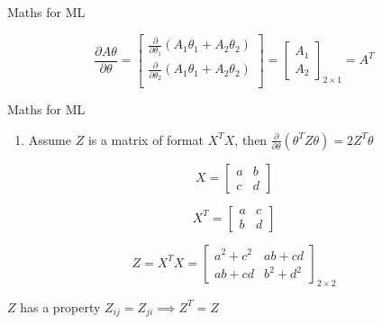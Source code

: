 \documentclass{beamer}
\newcounter{saveenumi}
\newcommand{\conti}{\setcounter{enumi}{\value{saveenumi}}}
\begin{document}
\begin{frame}{Maths for ML}

\begin{equation*}
    \frac{\partial A\theta}{\partial \theta} = \begin{bmatrix}
    \frac{\partial}{\partial \theta_{1} }(A_{1}\theta_{1}+A_{2}\theta_{2}) \\
    \frac{\partial}{\partial \theta_{2} }(A_{1}\theta_{1}+A_{2}\theta_{2}) \\
    \end{bmatrix}
    = \begin{bmatrix}
    A_{1}\\A_{2}
    \end{bmatrix}_{2 \times 1}
     = A^{T}
\end{equation*}
    
\end{frame}


\begin{frame}{Maths for ML}
\begin{enumerate}[<+->] \conti
	\item Assume $Z$ is a matrix of format $X^{T}X$, then $\frac{\partial}{ \partial \theta} (\theta^{T}Z\theta)=2Z^T\theta$
\end{enumerate}


\pause
\begin{equation*}
    X = \begin{bmatrix}
    a&b\\
    c&d
    \end{bmatrix}
\end{equation*}

\pause
\begin{equation*}
    X^{T} = \begin{bmatrix}
    a&c\\
    b&d
    \end{bmatrix}
\end{equation*}

\pause
\begin{equation*}
    Z = X^{T}X =  \begin{bmatrix}
    a^{2}+c^{2}&ab+cd\\
    ab+cd&b^{2}+d^{2}
    \end{bmatrix}_{2\times 2}
\end{equation*}

\pause
$Z$ has a property $Z_{ij}=Z_{ji} \implies Z^{T}=Z$

    
\end{frame}
\end{document}
